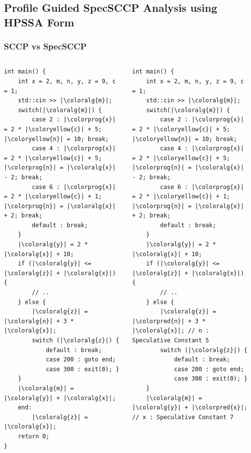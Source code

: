 \documentclass[aspectratio=169, compress]{beamer}
\newcommand{\colorprog}[1]{\colorbox{aquamarine}{#1}}
\newcommand{\colorpred}[1]{\colorbox{green}{#1}}
\newcommand{\coloralg}[1]{\colorbox{pink}{#1}}
\newcommand{\coloryellow}[1]{\colorbox{yellow}{#1}}
\begin{document}
\subsection{Profile Guided SpecSCCP Analysis using HPSSA Form}
\begin{frame}[fragile]
	\frametitle{SCCP vs SpecSCCP}
	\begin{columns}
		\begin{column}{0.4\textwidth}
			\begin{verbatim}
int main() {
	int x = 2, m, n, y, z = 9, c = 1;
	std::cin >> |\coloralg{m}|;
	switch(|\coloralg{m}|) {   
		case 2 : |\colorprog{x}| = 2 * |\coloryellow{c}| + 5; |\coloryellow{n}| = 10; break;
		case 4 : |\colorprog{x}| = 2 * |\coloryellow{c}| + 5; |\colorprog{n}| = |\coloralg{x}| - 2; break;
		case 6 : |\colorprog{x}| = 2 * |\coloryellow{c}| + 1; |\colorprog{n}| = |\coloralg{x}| + 2; break;
		default : break;
	}
	|\coloralg{y}| = 2 * |\coloralg{x}| + 10;
	if (|\coloralg{y}| <= |\coloralg{z}| + |\coloralg{x}|) {
		// ..
	} else {
		|\coloralg{z}| = |\coloralg{n}| + 3 * |\coloralg{x}|;
		switch (|\coloralg{z}|) {
			default : break;
			case 200 : goto end;
			case 300 : exit(0); }
	}
	|\coloralg{m}| = |\coloralg{y}| + |\coloralg{x}|;  
	end:
		|\coloralg{z}| = |\coloralg{x}|;
	return 0;
}
			\end{verbatim}
		\end{column}
		\begin{column}{0.4\textwidth}
			\begin{verbatim}
int main() {
	int x = 2, m, n, y, z = 9, c = 1;
	std::cin >> |\coloralg{m}|;
	switch(|\coloralg{m}|) {   
		case 2 : |\colorprog{x}| = 2 * |\coloryellow{c}| + 5; |\coloryellow{n}| = 10; break;
		case 4 : |\colorprog{x}| = 2 * |\coloryellow{c}| + 5; |\colorprog{n}| = |\coloralg{x}| - 2; break;
		case 6 : |\colorprog{x}| = 2 * |\coloryellow{c}| + 1; |\colorprog{n}| = |\coloralg{x}| + 2; break;
		default : break;
	}
	|\coloralg{y}| = 2 * |\coloralg{x}| + 10;
	if (|\coloralg{y}| <= |\coloralg{z}| + |\coloralg{x}|) {
		// ..
	} else {
		|\coloralg{z}| = |\colorpred{n}| + 3 * |\coloralg{x}|; // n : Speculative Constant 5
		switch (|\coloralg{z}|) {
			default : break;
			case 200 : goto end;
			case 300 : exit(0); }
	}
	|\coloralg{m}| = |\coloralg{y}| + |\colorpred{x}|;  // x : Speculative Constant 7

\end{verbatim}
\end{column}
\end{columns}
\end{frame}
\end{document}
